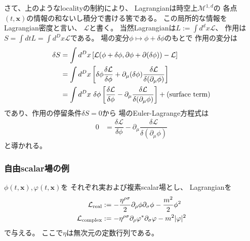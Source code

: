 さて、上のようなlocalityの制約により、
Lagrangianは時空上$\mathcal{M}^{1,d}$の
各点$(t, \bm{x})$の情報の和ないし積分で書ける筈である。
この局所的な情報をLagrangian密度と言い、
$\mathcal{L}$と書く。
当然Lagrangianは$L := \int d^d x \mathcal{L}$、
作用は$S= \int dt L = \int d^D x \mathcal{L}$である。
場の変分$\phi \mapsto \phi + \delta \phi$のもとで
作用の変分は
\begin{align}
    \delta S
    &=
    \int d^D x
    \left[
        \mathcal{L}(\phi + \delta \phi ,
        \partial \phi + \partial (\delta \phi))
        - \mathcal{L}
    \right]
\notag\\&=
    \int d^D x
    \left[
        \delta \phi
        \dfrac{\delta \mathcal{L}}{\delta \phi}
        +
        \partial_\mu (\delta \phi)
        \dfrac{\delta \mathcal{L}}{\delta (\partial_\mu \phi)}
    \right]
\notag\\&=
    \int d^D x
    \ 
    \delta \phi
    \left[
        \dfrac{\delta \mathcal{L}}{\delta \phi}
        -
        \partial_\mu
        \dfrac{\delta \mathcal{L}}{\delta (\partial_\mu \phi)}
    \right]
    + \text{(surface term)}
\end{align}
であり、作用の停留条件$\delta S = 0$から
場のEuler-Lagrange方程式は
\begin{align}
    0 &=
    \dfrac{\delta \mathcal{L}}{\delta \phi}
    -
    \partial_\mu
    \dfrac{\delta \mathcal{L}}{\delta (\partial_\mu \phi)}
\end{align}
と導かれる。

\subsubsection{自由scalar場の例}

$\phi(t, \bm{x}), \varphi(t, \bm{x})$を
それぞれ実および複素scalar場とし、
Lagrangianを
\begin{align}
    \mathcal{L}_{\rm real}
    &:=
    -
    \dfrac{ \eta^{\rho\sigma} }{2}
        \partial_\rho \phi
        \partial_\sigma \phi
    -
    \dfrac{m^2}{2} \phi^2
\\
    \mathcal{L}_{\rm complex}
    &:=
    -
    \eta^{\rho\sigma}
        \partial_\rho \varphi^*
        \partial_\sigma \varphi
    -
    m^2 |\varphi|^2
\end{align}
で与える。
ここで$\eta$は無次元の定数行列である。

